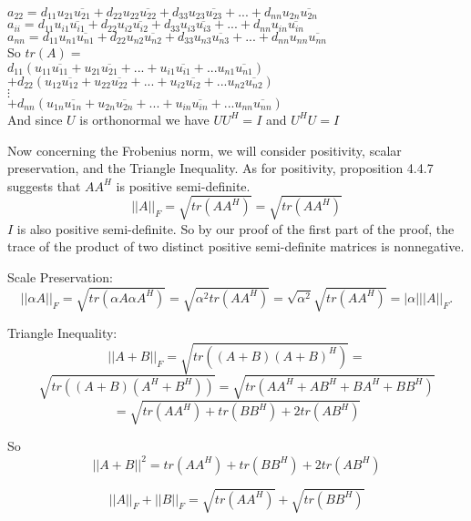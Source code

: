 \documentclass[letterpaper,12pt]{article}
\theoremstyle{definition}
\begin{document}
$a_{22} = d_{11}u_{21}\overline{u_{21}} + d_{22}u_{22}\overline{u_{22}} + d_{33}u_{23}\overline{u_{23}} + ... + d_{nn}u_{2n}\overline{u_{2n}}$\\

 $a_{ii} = d_{11}u_{i1}\overline{u_{i1}} + d_{22}u_{i2}\overline{u_{i2}} + d_{33}u_{i3}\overline{u_{i3}} + ... + d_{nn}u_{in}\overline{u_{in}}$\\

$a_{nn} = d_{11}u_{n1}\overline{u_{n1}} + d_{22}u_{n2}\overline{u_{n2}} + d_{33}u_{n3}\overline{u_{n3}} + ... + d_{nn}u_{nn}\overline{u_{nn}}$\\ 
 

So $tr(A) =$\\

$d_{11}( u_{11}\overline{u_{11}} +  u_{21}\overline{u_{21}} + ... + u_{i1}\overline{u_{i1}} + ...u_{n1}\overline{u_{n1}} )$\\
$+ d_{22}( u_{12}\overline{u_{12}} +  u_{22}\overline{u_{22}} + ... + u_{i2}\overline{u_{i2}} + ...u_{n2}\overline{u_{n2}} )$\\
$\vdots$\\
$+ d_{nn}( u_{1n}\overline{u_{1n}} +  u_{2n}\overline{u_{2n}} + ... + u_{in}\overline{u_{in}} + ...u_{nn}\overline{u_{nn}} )$\\

And since $U$ is orthonormal we have $UU^H = I$ and $U^HU = I$


Now concerning the Frobenius norm, we will consider positivity, scalar preservation, and the Triangle Inequality.
As for positivity, proposition 4.4.7 suggests that $AA^H$ is positive semi-definite. 
\[||A||_F = \sqrt{tr(AA^H)} = \sqrt{tr(AA^H)}\]
$I$ is also positive semi-definite. So by our proof of the first part of the proof, the trace of the product of two distinct positive semi-definite matrices is nonnegative. 

Scale Preservation:\\
\[||\alpha A||_F =\sqrt{tr(\alpha A \alpha A^H)} = \sqrt{  \alpha^2tr(AA^H)} = \sqrt{\alpha^2}\sqrt{tr(AA^H)} = |\alpha|||A||_F.\]

Triangle Inequality:\\
\[||A+B||_F = \sqrt{ tr( (A+B)(A+B)^H    )     } =\]
\[\sqrt{ tr( (A+B)(A^H+B^H)    )     } = \sqrt{ tr( AA^H + AB^H +BA^H+BB^H    )     }\]
\[=\sqrt{tr(AA^H) + tr(BB^H) + 2tr(AB^H)       }\]

So \[||A+B||^2 = tr(AA^H) + tr(BB^H) + 2tr(AB^H)\]

\[||A||_F + ||B||_F = \sqrt{tr(AA^H)} + \sqrt{tr(BB^H)}\]
\end{document}
